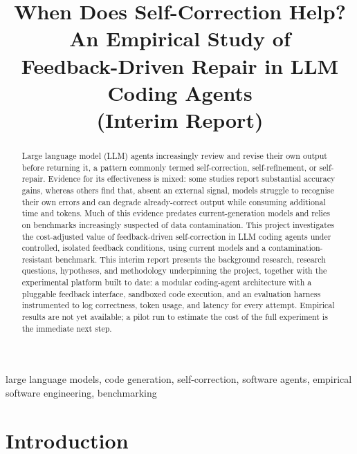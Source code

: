 \documentclass[conference]{IEEEtran}
\begin{document}
\title{When Does Self-Correction Help? An Empirical Study of\\
Feedback-Driven Repair in LLM Coding Agents\\
\textnormal{\large(Interim Report)}}

\author{
}

\maketitle

\begin{abstract}
Large language model (LLM) agents increasingly review and revise their own output before returning it, a pattern commonly termed self-correction, self-refinement, or self-repair. Evidence for its effectiveness is mixed: some studies report substantial accuracy gains, whereas others find that, absent an external signal, models struggle to recognise their own errors and can degrade already-correct output while consuming additional time and tokens. Much of this evidence predates current-generation models and relies on benchmarks increasingly suspected of data contamination. This project investigates the cost-adjusted value of feedback-driven self-correction in LLM coding agents under controlled, isolated feedback conditions, using current models and a contamination-resistant benchmark. This interim report presents the background research, research questions, hypotheses, and methodology underpinning the project, together with the experimental platform built to date: a modular coding-agent architecture with a pluggable feedback interface, sandboxed code execution, and an evaluation harness instrumented to log correctness, token usage, and latency for every attempt. Empirical results are not yet available; a pilot run to estimate the cost of the full experiment is the immediate next step.
\end{abstract}

\begin{IEEEkeywords}
large language models, code generation, self-correction, software agents, empirical software engineering, benchmarking
\end{IEEEkeywords}

\section{Introduction}
\end{document}
